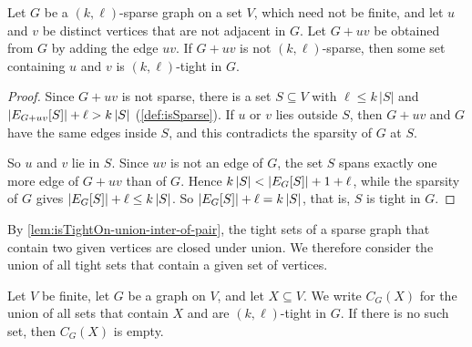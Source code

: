\begin{lemma}
  \label{lem:exists-isTightOn-of-insert-not-sparse}
  \leanok
  Let $G$ be a $(k, \ell)$-sparse graph on a set $V$, which need not be
  finite, and let $u$ and $v$ be distinct vertices that are not adjacent
  in $G$. Let $G + uv$ be obtained from $G$ by adding the edge $uv$. If
  $G + uv$ is not $(k, \ell)$-sparse, then some set containing $u$ and
  $v$ is $(k, \ell)$-tight in $G$.
\end{lemma}
\begin{proof}
  \leanok
  Since $G + uv$ is not sparse, there is a set $S \subseteq V$ with
  $\ell \le k\,|S|$ and $|\edgesIn[G + uv]{S}| + \ell > k\,|S|$
  (\cref{def:isSparse}). If $u$ or $v$ lies outside $S$, then $G + uv$
  and $G$ have the same edges inside $S$, and this contradicts the
  sparsity of $G$ at $S$.

  So $u$ and $v$ lie in $S$. Since $uv$ is not an edge of $G$, the set
  $S$ spans exactly one more edge of $G + uv$ than of $G$. Hence $k\,|S| < |\edgesIn{S}| + 1 + \ell$, while the
  sparsity of $G$ gives $|\edgesIn{S}| + \ell \le k\,|S|$. So
  $|\edgesIn{S}| + \ell = k\,|S|$, that is, $S$ is tight in $G$.
\end{proof}

By \cref{lem:isTightOn-union-inter-of-pair}, the tight sets of a sparse
graph that contain two given vertices are closed under union. We
therefore consider the union of all tight sets that contain a given set
of vertices.

\begin{definition}
  \label{def:isSparse-maxBlock}
  \leanok
  Let $V$ be finite, let $G$ be a graph on $V$, and let
  $X \subseteq V$. We write $C_G(X)$ for the union of all sets that
  contain $X$ and are $(k, \ell)$-tight in $G$. If there is no such
  set, then $C_G(X)$ is empty.
\end{definition}

